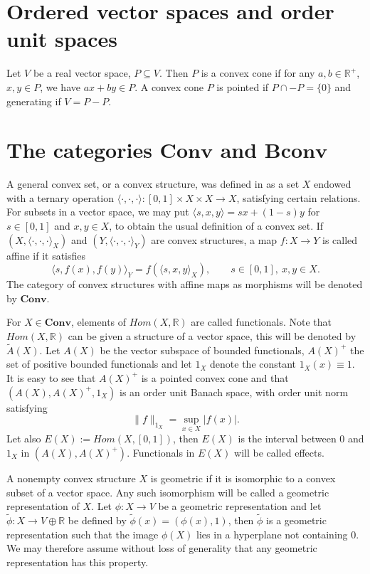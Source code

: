 \documentclass[12pt]{article}
\newcommand{\<}{\langle}
\def\>{\rangle}
\newcommand{\ct}[1]{\mathbf{#1}}
\begin{document}
\section{Ordered vector spaces and order unit spaces}

Let $V$ be a real vector space, $P\subseteq V$. Then $P$ is a convex cone if for any $a,b\in \mathbb R^+$, $x,y\in P$, we have $ax+by\in P$. A convex cone $P$ is pointed
 if $P\cap -P=\{0\}$ and generating if $V=P-P$.


\section{The categories $\ct{Conv}$ and $\ct{Bconv}$}


A general convex set, or a convex structure, was defined in \cite{gudder} as a set $X$ endowed with a ternary operation $\<\cdot,\cdot,\cdot\>: [0,1]\times X\times X\to X$,
 satisfying certain relations. For subsets in a vector space, we may put $\<s,x,y\>=sx+(1-s)y$ for $s\in [0,1]$ and $x,y\in X$, to obtain the usual definition of a convex set.  If $(X,\<\cdot,\cdot,\cdot\>_X)$ and $(Y,\<\cdot,\cdot,\cdot\>_Y)$ are convex structures, a map $f:X\to Y$ is called affine if it satisfies
\[
\<s,f(x),f(y)\>_Y=f(\<s,x,y\>_X),\qquad s\in [0,1],\ x,y\in X.
\]
The category of convex structures with affine maps as morphisms will be denoted by $\ct{Conv}$. 

For $X\in \ct{Conv}$, elements of $Hom(X,\mathbb R)$ are called functionals. Note that $Hom(X,\mathbb R)$ can be given a structure of a vector space, this will be denoted by $\widetilde A(X)$.  Let $A(X)$ be the vector subspace of bounded functionals, $A(X)^+$ the set of positive bounded functionals and let $1_X$ denote the constant $1_X(x)\equiv 1$. It is easy to see that $A(X)^+$ is a pointed convex cone and that $(A(X),A(X)^+,1_X)$ is an  order unit Banach space, with order unit norm satisfying
\[
\|f\|_{1_X}=\sup_{x\in X} |f(x)|.
\]
Let also $E(X):=Hom(X,[0,1])$, then $E(X)$ is the interval between 0 and $1_X$ in $(A(X),A(X)^+)$. Functionals in  $E(X)$ will be called effects.





A nonempty convex structure $X$ is geometric if it is isomorphic to a convex subset of a vector space. Any such isomorphism will be called a geometric representation of $X$.
Let $\phi:X\to V$ be a geometric representation and let $\tilde \phi:X\to V\oplus \mathbb R$ be defined by $\tilde \phi(x)=(\phi(x),1)$, then $\tilde \phi$ is a geometric 
representation  such that the image $\phi(X)$ lies in a hyperplane not containing 0. We may therefore assume without loss of generality  that any geometric representation has this property.
\end{document}
